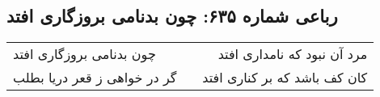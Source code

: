 \begin{center}
\section*{رباعی شماره ۶۳۵: چون بدنامی بروزگاری افتد}
\label{sec:0635}
\begin{longtable}{l p{0.5cm} r}
چون بدنامی بروزگاری افتد
&&
مرد آن نبود که نامداری افتد
\\
گر در خواهی ز قعر دریا بطلب
&&
کان کف باشد که بر کناری افتد
\\
\end{longtable}
\end{center}
